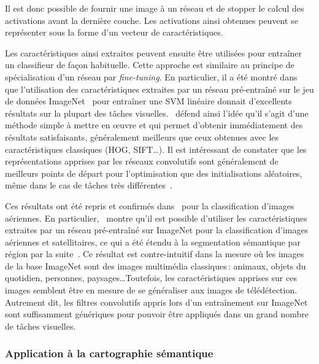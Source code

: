 Il est donc possible de fournir une image à un réseau et de stopper le calcul des activations avant la dernière couche. Les activations ainsi obtenues peuvent se représenter sous la forme d'un vecteur de caractéristiques.

Les caractéristiques ainsi extraites peuvent ensuite être utilisées pour entraîner un classifieur de façon habituelle. Cette approche est similaire au principe de spécialisation d'un réseau par \emph{fine-tuning}. En particulier, il a été montré dans~\cite{razavian_cnn_2014} que l'utilisation des caractéristiques extraites par un réseau pré-entraîné sur le jeu de données ImageNet~\cite{deng_imagenet:_2009} pour entraîner une \gls{SVM} linéaire donnait d'excellents résultats sur la plupart des tâches visuelles.~\cite{razavian_cnn_2014} défend ainsi l'idée qu'il s'agit d'une méthode simple à mettre en \oe{}uvre et qui permet d'obtenir immédiatement des résultats satisfaisants, généralement meilleurs que ceux obtenues avec les caractéristiques classiques (\gls{HOG}, \gls{SIFT}\dots). Il est intéressant de constater que les représentations apprises par les réseaux convolutifs sont généralement de meilleurs points de départ pour l'optimisation que des initialisations aléatoires, même dans le cas de tâches très différentes~\cite{yosinski_how_2014}.

Ces résultats ont été repris et confirmés dans~\cite{penatti_deep_2015,marmanis_deep_2016,lagrange_benchmarking_2015} pour la classification d'images aériennes. En particulier,~\cite{marmanis_deep_2016,penatti_deep_2015} montre qu'il est possible d'utiliser les caractéristiques extraites par un réseau pré-entraîné sur ImageNet pour la classification d'images aériennes et satellitaires, ce qui a été étendu à la segmentation sémantique par région par la suite~\cite{lagrange_benchmarking_2015}. Ce résultat est contre-intuitif dans la mesure où les images de la base ImageNet sont des images multimédia classiques\,: animaux, objets du quotidien, personnes, paysages\dots Toutefois, les caractéristiques apprises sur ces images semblent être en mesure de se généraliser aux images de télédétection. Autrement dit, les filtres convolutifs appris lors d'un entraînement sur ImageNet sont suffisamment génériques pour pouvoir être appliqués dans un grand nombre de tâches visuelles.

\subsubsection{Application à la cartographie sémantique}


